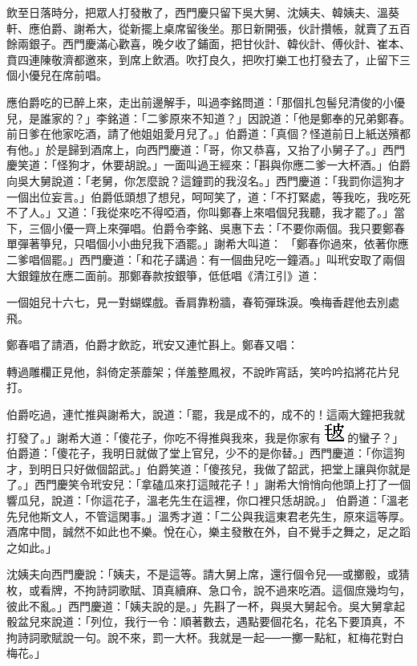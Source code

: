 飲至日落時分，把眾人打發散了，西門慶只留下吳大舅、沈姨夫、韓姨夫、溫葵軒、應伯爵、謝希大，從新擺上桌席留後坐。那日新開張，伙計攢帳，就賣了五百餘兩銀子。西門慶滿心歡喜，晚夕收了鋪面，把甘伙計、韓伙計、傅伙計、崔本、賁四連陳敬濟都邀來，到席上飲酒。吹打良久，把吹打樂工也打發去了，止留下三個小優兒在席前唱。

應伯爵吃的已醉上來，走出前邊解手，叫過李銘問道：「那個扎包髻兒清俊的小優兒，是誰家的？」李銘道：「二爹原來不知道？」因說道：「他是鄭奉的兄弟鄭春。前日爹在他家吃酒，請了他姐姐愛月兒了。」伯爵道：「真個？怪道前日上紙送殯都有他。」於是歸到酒席上，向西門慶道：「哥，你又恭喜，又抬了小舅子了。」西門慶笑道：「怪狗才，休要胡說。」一面叫過王經來：「斟與你應二爹一大杯酒。」伯爵向吳大舅說道：「老舅，你怎麼說？這鐘罰的我沒名。」西門慶道：「我罰你這狗才一個出位妄言。」伯爵低頭想了想兒，呵呵笑了，道：「不打緊處，等我吃，我吃死不了人。」又道：「我從來吃不得啞酒，你叫鄭春上來唱個兒我聽，我才罷了。」當下，三個小優一齊上來彈唱。伯爵令李銘、吳惠下去：「不要你兩個。我只要鄭春單彈著箏兒，只唱個小小曲兒我下酒罷。」謝希大叫道： 「鄭春你過來，依著你應二爹唱個罷。」西門慶道：「和花子講過：有一個曲兒吃一鐘酒。」叫玳安取了兩個大銀鐘放在應二面前。那鄭春款按銀箏，低低唱《清江引》道：

一個姐兒十六七，見一對蝴蝶戲。香肩靠粉牆，春筍彈珠淚。喚梅香趕他去別處飛。

鄭春唱了請酒，伯爵才飲訖，玳安又連忙斟上。鄭春又唱：

轉過雕欄正見他，斜倚定荼蘼架；佯羞整鳳衩，不說昨宵話，笑吟吟掐將花片兒打。

伯爵吃過，連忙推與謝希大，說道：「罷，我是成不的，成不的！這兩大鐘把我就打發了。」謝希大道：「傻花子，你吃不得推與我來，我是你家有
\includegraphics{figures-char/image00570.jpeg}%
的蠻子？」伯爵道：「傻花子，我明日就做了堂上官兒，少不的是你替。」西門慶道：「你這狗才，到明日只好做個韶武。」伯爵笑道：「傻孩兒，我做了韶武，把堂上讓與你就是了。」西門慶笑令玳安兒：「拿磕瓜來打這賊花子！」謝希大悄悄向他頭上打了一個響瓜兒，說道：「你這花子，溫老先生在這裡，你口裡只恁胡說。」 伯爵道：「溫老先兒他斯文人，不管這閑事。」溫秀才道：「二公與我這東君老先生，原來這等厚。酒席中間，誠然不如此也不樂。悅在心，樂主發散在外，自不覺手之舞之，足之蹈之如此。」

沈姨夫向西門慶說：「姨夫，不是這等。請大舅上席，還行個令兒──或擲骰，或猜枚，或看牌，不拘詩詞歌賦、頂真續麻、急口令，說不過來吃酒。這個庶幾均勻，彼此不亂。」西門慶道：「姨夫說的是。」先斟了一杯，與吳大舅起令。吳大舅拿起骰盆兒來說道：「列位，我行一令：順著數去，遇點要個花名，花名下要頂真，不拘詩詞歌賦說一句。說不來，罰一大杯。我就是一起──一擲一點紅，紅梅花對白梅花。」

